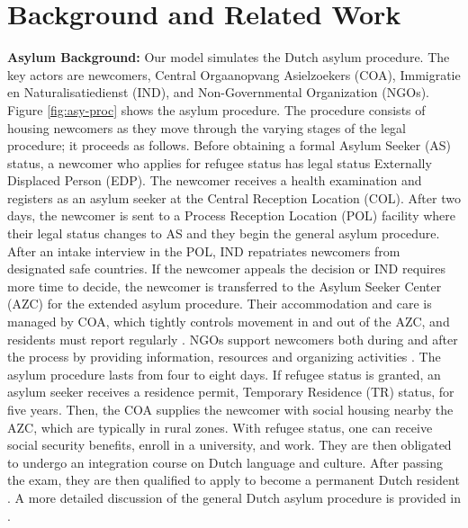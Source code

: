 \documentclass{scspaperproc}
\theoremstyle{scsthe}
\begin{document}




\section{Background and Related Work}
\label{sec:value-background}
{\bf Asylum Background:} Our model simulates the Dutch asylum procedure. The key actors are newcomers, Central Orgaanopvang Asielzoekers (COA), Immigratie en Naturalisatiedienst (IND), and Non-Governmental Organization (NGOs). Figure \ref{fig:asy-proc} shows the asylum procedure. The procedure consists of housing newcomers as they move through the varying stages of the legal procedure; it proceeds as follows. Before obtaining a formal Asylum Seeker (AS) status, a newcomer who applies for refugee status has legal status Externally Displaced Person (EDP). The newcomer receives a health examination and registers as an asylum seeker at the Central Reception Location (COL). After two days, the newcomer is sent to a Process Reception Location (POL) facility where their legal status changes to AS and they begin the general asylum procedure. After an intake interview in the POL, IND repatriates newcomers from designated safe countries. If the newcomer appeals the decision or IND requires more time to decide, the newcomer is transferred to the Asylum Seeker Center (AZC) for the extended asylum procedure. Their accommodation and care is managed by COA, which tightly controls movement in and out of the AZC, and residents must report regularly \cite{9}. NGOs support newcomers both during and after the process by providing information, resources and organizing activities \cite{94}. The asylum procedure lasts from four to eight days. If refugee status is granted, an asylum seeker receives a residence permit, Temporary Residence (TR) status, for five years. Then, the COA supplies the newcomer with social housing nearby the AZC, which are typically in rural zones. With refugee status, one can receive social security benefits, enroll in a university, and work. They are then obligated to undergo an integration course on Dutch language and culture. After passing the exam, they are then qualified to apply to become a permanent Dutch resident \cite{9}. A more detailed discussion of the general Dutch asylum procedure is provided in \cite{phil.masters.thesis}.
\end{document}
